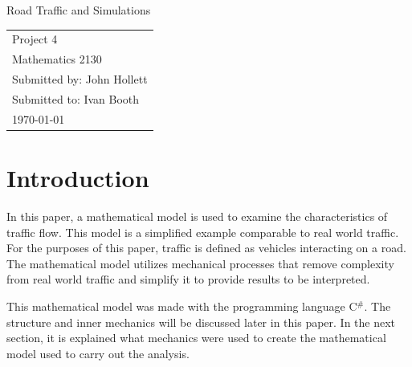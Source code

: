 \documentclass[12pt]{extarticle}
\begin{document}
\begin{titlepage}
\vspace*{2in}
\begin{center}
{\LARGE Road Traffic and Simulations}
\end{center}

\vspace{2cm}


\vspace{3in}
\begin{flushright}
\begin{tabular}{l}
Project 4 \\
Mathematics 2130\\
Submitted by: John Hollett\\
Submitted to: Ivan Booth\\
\today
\end{tabular}
\end{flushright}


\end{titlepage}


\rfoot{\thepage}





\section{Introduction}

In this paper, a mathematical model is used to examine the characteristics of traffic flow. This model is a simplified example comparable to real world traffic. For the purposes of this paper, traffic is defined as vehicles interacting on a road. The mathematical model utilizes mechanical processes that remove complexity from real world traffic and simplify it to provide results to be interpreted.

This mathematical model was made with the programming language C$^\#$. The structure and inner mechanics will be discussed later in this paper. In the next section, it is explained what mechanics were used to create the mathematical model used to carry out the analysis.
\end{document}
